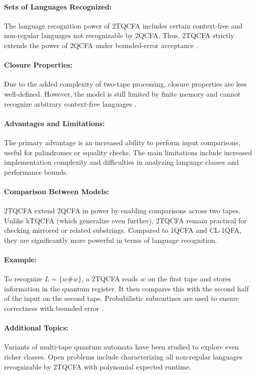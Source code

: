 \paragraph{Sets of Languages Recognized:}  
The language recognition power of 2TQCFA includes certain context-free and non-regular languages not recognizable by 2QCFA. Thus, 2TQCFA strictly extends the power of 2QCFA under bounded-error acceptance \cite{zheng2011two}.

\paragraph{Closure Properties:}  
Due to the added complexity of two-tape processing, closure properties are less well-defined. However, the model is still limited by finite memory and cannot recognize arbitrary context-free languages \cite{li2015hybrid}.

\paragraph{Advantages and Limitations:}  
The primary advantage is an increased ability to perform input comparisons, useful for palindromes or equality checks. The main limitations include increased implementation complexity and difficulties in analyzing language classes and performance bounds.

\paragraph{Comparison Between Models:}  
2TQCFA extend 2QCFA in power by enabling comparisons across two tapes. Unlike kTQCFA (which generalize even further), 2TQCFA remain practical for checking mirrored or related substrings. Compared to 1QCFA and CL-1QFA, they are significantly more powerful in terms of language recognition.

\paragraph{Example:}  
To recognize $L = \{ w \# w \}$, a 2TQCFA reads $w$ on the first tape and stores information in the quantum register. It then compares this with the second half of the input on the second tape. Probabilistic subroutines are used to ensure correctness with bounded error \cite{zheng2011two}.

\paragraph{Additional Topics:}  
Variants of multi-tape quantum automata have been studied to explore even richer classes. Open problems include characterizing all non-regular languages recognizable by 2TQCFA with polynomial expected runtime.


